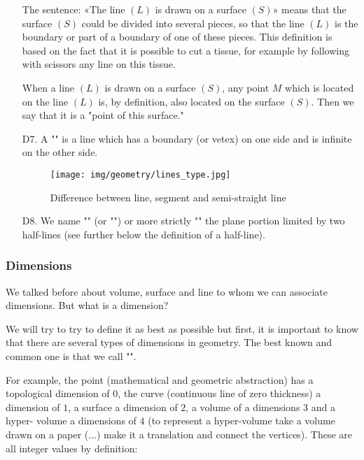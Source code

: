 \begin{enumerate}
	\begin{tcolorbox}[title=Remark,colframe=black,arc=10pt]
		The sentence: «The line $(L)$ is drawn on a surface $(S)$» means that the surface $(S)$ could be divided into several pieces, so that the line $(L)$ is the boundary or part of a boundary of one of these pieces. This definition is based on the fact that it is possible to cut a tissue, for example by following with scissors any line on this tissue.
	\end{tcolorbox}

When a line $(L)$ is drawn on a surface $(S)$, any point $M$ which is located on the line $(L)$ is, by definition, also located on the surface $(S)$. Then we say that it is a "point of this surface."

		\item[D7.] A "" is a line which has a boundary (or vetex) on one side and is infinite on the other side.
		
		\begin{figure}[H]
		\centering
		\texttt{[image: img/geometry/lines\_type.jpg]}
		\caption{Difference between line, segment and semi-straight line}
		\end{figure}
		
		\item[D8.] We name "" (or "") or more strictly "" the plane portion limited by two half-lines (see further below the definition of a half-line).
	\end{enumerate}
	
	\subsubsection{Dimensions}\label{dimensions}

We talked before about volume, surface and line to whom we can associate dimensions. But what is a dimension? 

We will try to try to define it as best as possible but first, it is important to know that there are several types of dimensions in geometry. The best known and common one is that we call "".

For example, the point (mathematical and geometric abstraction) has a topological dimension of $0$, the curve (continuous line of zero thickness) a dimension of $1$, a  surface a dimension of $2$, a volume of a dimensions $3$ and a hyper- volume a dimensions of $4$ (to represent a hyper-volume take a volume drawn on a paper (...) make it a translation and connect the vertices). These are all integer values by definition:

